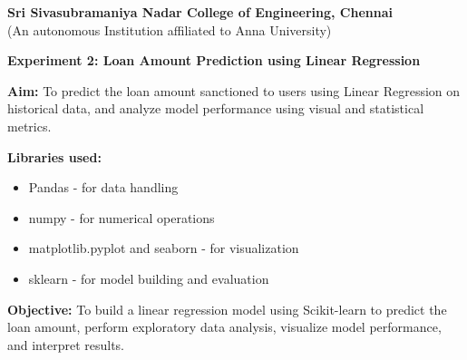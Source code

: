 \documentclass[11pt]{article}
\begin{document}
\begin{center}
    \large \textbf{Sri Sivasubramaniya Nadar College of Engineering, Chennai} \\
    (An autonomous Institution affiliated to Anna University) \\
    \vspace{0.3cm}
\end{center}
\begin{table}[!h]
\renewcommand{\arraystretch}{1.5}
\end{table}
\begin{center}
 \textbf{
{\Large Experiment 2: Loan Amount Prediction using Linear Regression}
}
\end{center}
\textbf{\large Aim:} To predict the loan amount sanctioned to users using Linear Regression on historical data, and analyze model performance using visual and statistical metrics. 

\vspace{0.5cm}
\noindent
\textbf{\large Libraries used:} 
\begin{itemize}
    \item Pandas - for data handling
    \item numpy - for numerical operations
    \item matplotlib.pyplot and seaborn - for visualization
    \item sklearn - for model building and evaluation
\end{itemize}

\vspace{0.5cm}
\noindent
\textbf{\large Objective:} To build a linear regression model using Scikit-learn to predict the loan amount, perform exploratory data analysis, visualize model performance, and interpret results.
\end{document}
